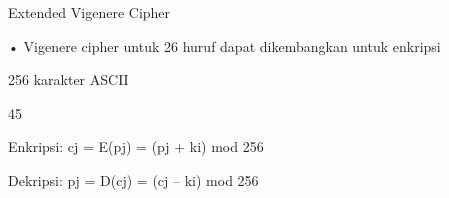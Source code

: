 \documentclass{article}
\begin{document}

Extended Vigenere Cipher 

• Vigenere cipher untuk 26 huruf dapat dikembangkan untuk enkripsi 

256 karakter ASCII

45

Enkripsi:  cj = E(pj) = (pj + ki) mod 256   

Dekripsi:  pj = D(cj) = (cj – ki) mod 256
\end{document}
